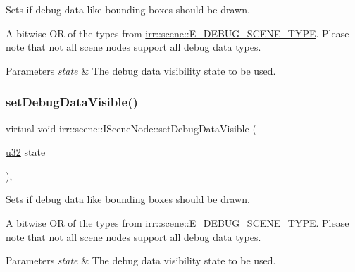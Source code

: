 Sets if debug data like bounding boxes should be drawn. 

A bitwise OR of the types from \hyperlink{namespaceirr_1_1scene_a52b664c4c988113735042b168fc32dbe}{irr\+::scene\+::\+E\+\_\+\+D\+E\+B\+U\+G\+\_\+\+S\+C\+E\+N\+E\+\_\+\+T\+Y\+PE}. Please note that not all scene nodes support all debug data types. 
\begin{DoxyParams}{Parameters}
{\em state} & The debug data visibility state to be used. \\
\hline
\end{DoxyParams}
\mbox{\label{classirr_1_1scene_1_1ISceneNode_ad83877ca84fa9cde95f099f961e80577}} 
\subsubsection{\texorpdfstring{set\+Debug\+Data\+Visible()}{setDebugDataVisible()}\hspace{0.1cm}{\footnotesize\ttfamily [2/2]}}
{\footnotesize\ttfamily virtual void irr\+::scene\+::\+I\+Scene\+Node\+::set\+Debug\+Data\+Visible (\begin{DoxyParamCaption}\item[{\hyperlink{namespaceirr_a0416a53257075833e7002efd0a18e804}{u32}}]{state }\end{DoxyParamCaption})\hspace{0.3cm}{\ttfamily [inline]}, {\ttfamily [virtual]}}



Sets if debug data like bounding boxes should be drawn. 

A bitwise OR of the types from \hyperlink{namespaceirr_1_1scene_a52b664c4c988113735042b168fc32dbe}{irr\+::scene\+::\+E\+\_\+\+D\+E\+B\+U\+G\+\_\+\+S\+C\+E\+N\+E\+\_\+\+T\+Y\+PE}. Please note that not all scene nodes support all debug data types. 
\begin{DoxyParams}{Parameters}
{\em state} & The debug data visibility state to be used. \\
\hline
\end{DoxyParams}
\mbox{\label{classirr_1_1scene_1_1ISceneNode_ade60c630c4768200b1d15debbd00fe0e}} 
